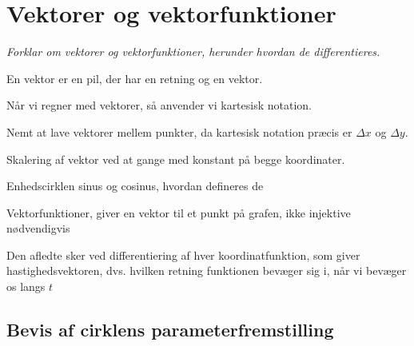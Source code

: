 \section{Vektorer og vektorfunktioner}

\emph{Forklar om vektorer og vektorfunktioner, herunder hvordan de differentieres.}

En vektor er en pil, der har en retning og en vektor.

Når vi regner med vektorer, så anvender vi kartesisk notation.

Nemt at lave vektorer mellem punkter, da kartesisk notation præcis er $\Delta x$ og $\Delta y$.

Skalering af vektor ved at gange med konstant på begge koordinater.

Enhedscirklen sinus og cosinus, hvordan defineres de

Vektorfunktioner, giver en vektor til et punkt på grafen, ikke injektive nødvendigvis

Den afledte sker ved differentiering af hver koordinatfunktion,
som giver hastighedsvektoren,
dvs. hvilken retning funktionen bevæger sig i, når vi bevæger os langs $t$

\subsection{Bevis af cirklens parameterfremstilling}

